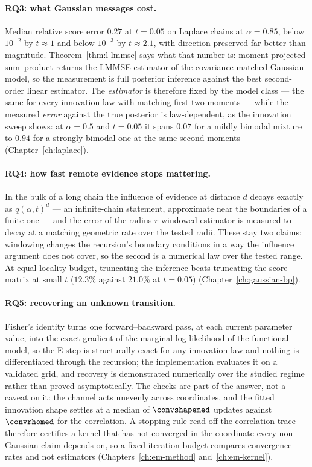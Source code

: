 \paragraph{RQ3: what Gaussian messages cost.} Median relative score error
$0.27$ at $t=0.05$ on Laplace chains at $\alpha = 0.85$, below $10^{-2}$ by
$t \approx 1$ and
below $10^{-3}$ by $t \approx 2.1$, with direction preserved far better than
magnitude. Theorem~\ref{thm:l-lmmse} says what that number is: moment-projected
sum--product returns the LMMSE estimator of the covariance-matched Gaussian
model, so the measurement is full posterior inference against the best
second-order linear estimator. The \emph{estimator} is therefore fixed by the
model class --- the same for every innovation law with matching first two
moments --- while the measured \emph{error} against the true posterior is
law-dependent, as the innovation sweep shows: at $\alpha = 0.5$ and
$t = 0.05$ it spans $0.07$ for a mildly bimodal
mixture to $0.94$ for a strongly bimodal one at the same second moments
(Chapter~\ref{ch:laplace}).

\paragraph{RQ4: how fast remote evidence stops mattering.} In the bulk of a
long chain the influence of
evidence at distance $d$ decays exactly as $q(\alpha,t)^d$ --- an
infinite-chain statement, approximate near the boundaries of a finite one ---
and the error of the
radius-$r$ windowed estimator is measured to decay at a matching geometric
rate over the tested radii. These stay two claims: windowing changes the
recursion's
boundary conditions in a way the influence argument does not cover, so the
second is a numerical law over the tested range. At equal locality budget,
truncating the inference beats truncating the score matrix at small $t$
($12.3\%$ against $21.0\%$ at $t = 0.05$) (Chapter~\ref{ch:gaussian-bp}).

\paragraph{RQ5: recovering an unknown transition.} Fisher's identity turns one
forward--backward pass, at each current parameter value, into the exact
gradient of the marginal log-likelihood
of the functional model, so the E-step is structurally exact for any
innovation law and nothing is
differentiated through the recursion; the implementation evaluates it on a
validated grid, and recovery is demonstrated numerically over the studied
regime rather than proved asymptotically. The checks are part of the answer, not a
caveat on it: the channel acts unevenly across coordinates, and the fitted
innovation shape settles at a median of $\convshapemed$ updates against
$\convrhomed$ for the correlation. A stopping rule read off the correlation
trace therefore certifies a kernel that has not converged in the coordinate
every non-Gaussian claim depends on, so a fixed iteration budget compares
convergence rates and not estimators
(Chapters~\ref{ch:em-method} and~\ref{ch:em-kernel}).

